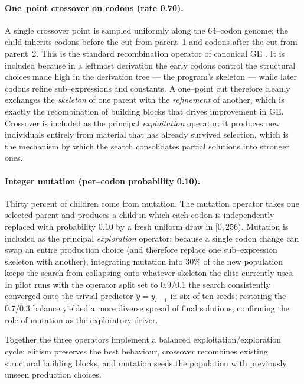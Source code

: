 \documentclass[12pt,a4paper]{article}
\begin{document}
\paragraph{One--point crossover on codons (rate 0.70).}
A single crossover point is sampled uniformly along the 64--codon
genome; the child inherits codons before the cut from parent~1 and
codons after the cut from parent~2. This is the standard recombination
operator of canonical GE \cite{ONeillRyan2001}. It is included because
in a leftmost derivation the early codons control the structural choices
made high in the derivation tree --- the program's skeleton --- while
later codons refine sub--expressions and constants. A one--point cut
therefore cleanly exchanges the \emph{skeleton} of one parent with the
\emph{refinement} of another, which is exactly the recombination of
building blocks that drives improvement in GE. Crossover is included as
the principal \emph{exploitation} operator: it produces new individuals
entirely from material that has already survived selection, which is the
mechanism by which the search consolidates partial solutions into
stronger ones.

\paragraph{Integer mutation (per--codon probability 0.10).}
Thirty percent of children come from mutation. The mutation operator
takes one selected parent and produces a child in which each codon is
independently replaced with probability $0.10$ by a fresh uniform draw
in $[0, 256)$. Mutation is included as the principal \emph{exploration}
operator: because a single codon change can swap an entire production
choice (and therefore replace one sub--expression skeleton with another),
integrating mutation into 30\% of the new population keeps the search
from collapsing onto whatever skeleton the elite currently uses. In
pilot runs with the operator split set to $0.9/0.1$ the search consistently
converged onto the trivial predictor $\hat{y}=y_{t-1}$ in six of ten
seeds; restoring the $0.7/0.3$ balance yielded a more diverse spread of
final solutions, confirming the role of mutation as the exploratory
driver.

Together the three operators implement a balanced
exploitation/exploration cycle: elitism preserves the best behaviour,
crossover recombines existing structural building blocks, and mutation
seeds the population with previously unseen production choices.

\end{document}
